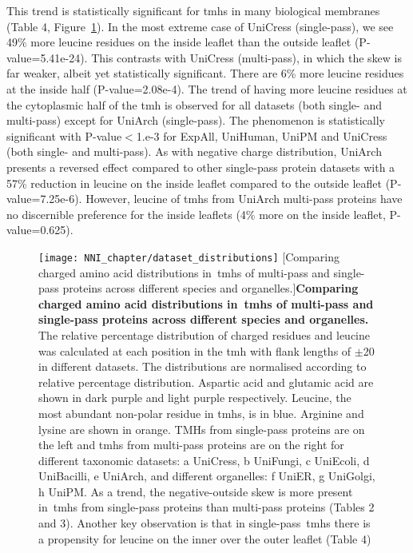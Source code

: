 This trend is statistically significant for \gls{tmh}s in many biological membranes (Table 4, Figure~\ref{fig:dataset_distributions}).
In the most extreme case of UniCress (single-pass), we see 49\% more leucine residues on the inside leaflet than the outside leaflet (P-value=5.41e-24).
This contrasts with UniCress (multi-pass), in which the skew is far weaker, albeit yet statistically significant.
There are 6\% more leucine residues at the inside half (P-value=2.08e-4).
The trend of having more leucine residues at the cytoplasmic half of the \gls{tmh} is observed for all datasets (both single- and multi-pass) except for UniArch (single-pass).
The phenomenon is statistically significant with P-value$<$1.e-3 for ExpAll, UniHuman, UniPM and UniCress (both single- and multi-pass).
As with negative charge distribution, UniArch presents a reversed effect compared to other single-pass protein datasets with a 57\% reduction in leucine on the inside leaflet compared to the outside leaflet (P-value=7.25e-6).
However, leucine of \gls{tmh}s from UniArch multi-pass proteins have no discernible preference for the inside leaflets (4\% more on the inside leaflet, P-value=0.625).

\begin{figure}[!ht]
\centering
\texttt{[image: NNI\_chapter/dataset\_distributions]}
[Comparing charged amino acid distributions in~\gls{tmh}s of multi-pass and single-pass proteins across different species and organelles.]{\textbf{Comparing charged amino acid distributions in~\gls{tmh}s of multi-pass and single-pass proteins across different species and organelles.} The relative percentage distribution of charged residues and leucine was calculated at each position in the \gls{tmh} with flank lengths of $\pm$20 in different datasets.
The distributions are normalised according to relative percentage distribution.
Aspartic acid and glutamic acid are shown in dark purple and light purple respectively.
Leucine, the most abundant non-polar residue in \gls{tmh}s, is in blue.
Arginine and lysine are shown in orange.
TMHs from single-pass proteins are on the left and \gls{tmh}s from multi-pass proteins are on the right for different taxonomic datasets: a UniCress, b UniFungi, c UniEcoli, d UniBacilli, e UniArch, and different organelles: f UniER, g UniGolgi, h UniPM.
As a trend, the negative-outside skew is more present in~\gls{tmh}s from single-pass proteins than multi-pass proteins (Tables 2 and 3).
Another key observation is that in single-pass~\gls{tmh}s there is a propensity for leucine on the inner over the outer leaflet (Table 4)}


\label{fig:dataset_distributions}
\end{figure}

